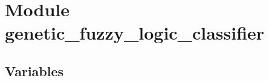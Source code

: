%
%
%


\section{Module genetic\_fuzzy\_logic\_classifier}

    \label{genetic_fuzzy_logic_classifier}


  \subsection{Variables}

